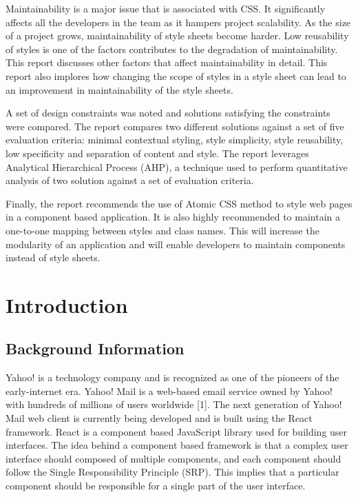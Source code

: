 \documentclass[12pt]{article}
\begin{document}
Maintainability is a major issue that is associated with CSS. It significantly affects all the developers in the team as it hampers project scalability. As the size of a project grows, maintainability of style sheets become harder. Low reusability of styles is one of the factors contributes to the degradation of maintainability. This report discusses other factors that affect maintainability in detail. This report also implores how changing the scope of styles in a style sheet can lead to an improvement in maintainability of the style sheets.

A set of design constraints was noted and solutions satisfying the constraints were compared. The report compares two different solutions against a set of five evaluation criteria: minimal contextual styling, style simplicity, style reusability, low specificity and separation of content and style. The report leverages Analytical Hierarchical Process  (AHP), a technique used to perform quantitative analysis of two solution against a set of evaluation criteria. 

Finally, the report recommends the use of Atomic CSS method to style web pages in a component based application. It is also highly recommended to maintain a one-to-one mapping between styles and class names. This will increase the modularity of an application and will enable developers to maintain components instead of style sheets.

\newpage

\toc
\lof
\lot

\section{Introduction}
\subsection{Background Information}

Yahoo! is a technology company and is recognized as one of the pioneers of the early-internet era. Yahoo! Mail is a web-based email service owned by Yahoo! with hundreds of millions of users worldwide [1]. The next generation of Yahoo! Mail web client is currently being developed and is built using the React framework. React is a component based JavaScript library used for building user interfaces. The idea behind a component based framework is that a complex user interface should composed of multiple components, and each component should follow the Single Responsibility Principle (SRP). This implies that a particular component should be responsible for a single part of the user interface.
\end{document}
